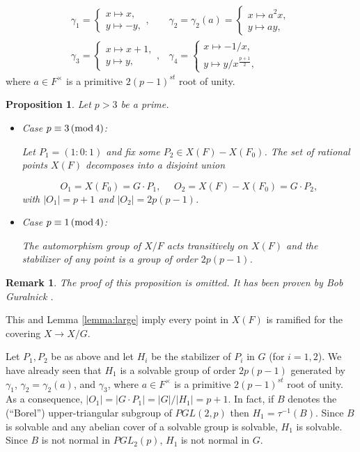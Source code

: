 \documentclass[12pt]{article}
\newtheorem{proposition}[theorem]{Proposition}
\newtheorem{remark}{Remark}
\numberwithin{equation}{section}
\begin{document}
\[
\begin{array}{cc}
\gamma_1=
\left\{
\begin{array}{c}
x\longmapsto x,\\
y\longmapsto -y,
\end{array}
\right. ,
&
\gamma_2=\gamma_2(a)=
\left\{
\begin{array}{c}
x\longmapsto a^2x,\\
y\longmapsto ay,
\end{array}
\right.\\
\gamma_3=
\left\{
\begin{array}{c}
x\longmapsto x+1,\\
y\longmapsto y,
\end{array}
\right. ,
&
\gamma_4=
\left\{
\begin{array}{c}
x\longmapsto -1/x,\\
y\longmapsto y/x^{\frac{p+1}{2}},
\end{array}
\right. 
\end{array}
\]
where $a\in F^\times$ is a primitive $2(p-1)^{st}$ root
of unity.


\begin{proposition}
\label{prop:orbits} 
Let $p>3$ be a prime.
\begin{itemize}
\item[(a)] Case $p\equiv 3\, ({\rm mod}\, 4)$:

Let $P_1=(1:0:1)$ and fix some $P_2\in X(F)-X(F_0)$.
The set of rational points $X(F)$ decomposes into
a disjoint union

\[
O_1=X(F_0)=G\cdot P_1,\ \ \ \ \ \ 
O_2=X(F)-X(F_0)=G\cdot P_2,
\]
with $|O_1|=p+1$ and $|O_2|=2p(p-1)$.

\item[(b)] Case $p\equiv 1\, ({\rm mod}\, 4)$:

The automorphism group of $X/F$ acts transitively
on $X(F)$ and the stabilizer of any point is
a group of order $2p(p-1)$.

\end{itemize}
\end{proposition}

\begin{remark}
The proof of this proposition is omitted.
It has been proven by Bob Guralnick \cite{Gu}.
\end{remark}


This and Lemma \ref{lemma:large} imply 
every point in $X(F)$ is ramified for the covering
$X\rightarrow X/G$.

Let $P_1,P_2$ be as above and 
let $H_i$ be the stabilizer of $P_i$ in $G$ (for $i=1,2$).
We have already seen that $H_1$ is a solvable group of order 
$2p(p-1)$ generated by 
$\gamma_1$, $\gamma_2=\gamma_2(a)$, and $\gamma_3$, where 
$a\in F^\times$ is a primitive $2(p-1)^{st}$ root
of unity. As a consequence,
$|O_1|=|G\cdot P_1|=|G|/|H_1|=p+1$. 
In fact,
if $B$ denotes the (``Borel'') upper-triangular subgroup
of $PGL(2,p)$ then $H_1=\tau^{-1}(B)$.
Since $B$ is solvable and any abelian cover of a solvable group is
solvable, $H_1$ is solvable.
Since $B$ is not normal in $PGL_2(p)$, $H_1$ is not normal in $G$.
\end{document}
